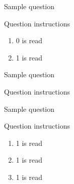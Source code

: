\documentclass[11pt]{exam}
\begin{document}
\begin{questions}

	\question Sample question


	\quad

	Question instructions

	\begin{framed}


	\end{framed}

        \begin{enumerate}[label=(\alph*)]
            \item 0 is read
                \begin{framed}
                \end{framed}

            \item 1 is read
                \begin{framed}
                \end{framed}
        \end{enumerate}


	\question Sample question


	\quad

	Question instructions

	\begin{framed}


	\end{framed}


	\question Sample question

	Question instructions

	\begin{framed}


	\end{framed}

        \begin{enumerate}[label=(\roman*)]
            \item 1 is read
                \begin{framed}
                \end{framed}
            \item 1 is read
                \begin{framed}
                \end{framed}
            \item 1 is read
                \begin{framed}
                \end{framed}
        \end{enumerate}


\end{questions}
\end{document}
